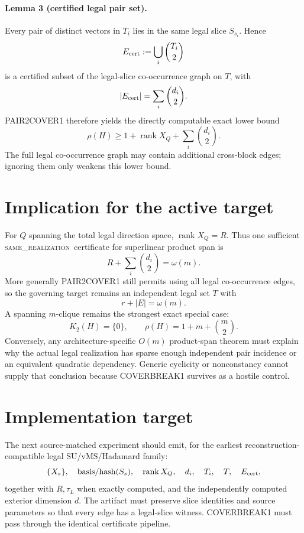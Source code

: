 \documentclass[11pt]{article}
\newcommand{\same}{\textsc{same\_realization}}
\begin{document}
\paragraph{Lemma 3 (certified legal pair set).}
Every pair of distinct vectors in \(T_i\) lies in the same legal slice \(S_{s_i}\). Hence
\[
 E_{\rm cert}:=\bigcup_i\binom{T_i}{2}
\]
is a certified subset of the legal-slice co-occurrence graph on \(T\), with
\[
 |E_{\rm cert}|=\sum_i\binom{d_i}{2}.
\]
PAIR2COVER1 therefore yields the directly computable exact lower bound
\[
 \boxed{
 \rho(H)\ge
 1+\operatorname{rank}X_Q+
 \sum_i\binom{d_i}{2}.
 }
\]
The full legal co-occurrence graph may contain additional cross-block edges; ignoring them only weakens this lower bound.

\section*{Implication for the active target}
For \(Q\) spanning the total legal direction space, \(\operatorname{rank}X_Q=R\). Thus one sufficient \same\ certificate for superlinear product span is
\[
 R+\sum_i\binom{d_i}{2}=\omega(m).
\]
More generally PAIR2COVER1 still permits using all legal co-occurrence edges, so the governing target remains an independent legal set \(T\) with
\[
 r+|E|=\omega(m).
\]
A spanning \(m\)-clique remains the strongest exact special case:
\[
 K_2(H)=\{0\},\qquad
 \rho(H)=1+m+\binom m2.
\]
Conversely, any architecture-specific \(O(m)\) product-span theorem must explain why the actual legal realization has sparse enough independent pair incidence or an equivalent quadratic dependency. Generic cyclicity or nonconstancy cannot supply that conclusion because COVERBREAK1 survives as a hostile control.

\section*{Implementation target}
The next source-matched experiment should emit, for the earliest reconstruction-compatible legal SU/vMS/Hadamard family:
\[
 \{X_s\},\quad \text{basis/hash}(S_s),\quad
 \operatorname{rank}X_Q,\quad
 d_i,\quad T_i,\quad T,\quad E_{\rm cert},
\]
together with \(R,\tau_L\) when exactly computed, and the independently computed exterior dimension \(d\). The artifact must preserve slice identities and source parameters so that every edge has a legal-slice witness. COVERBREAK1 must pass through the identical certificate pipeline.
\end{document}
